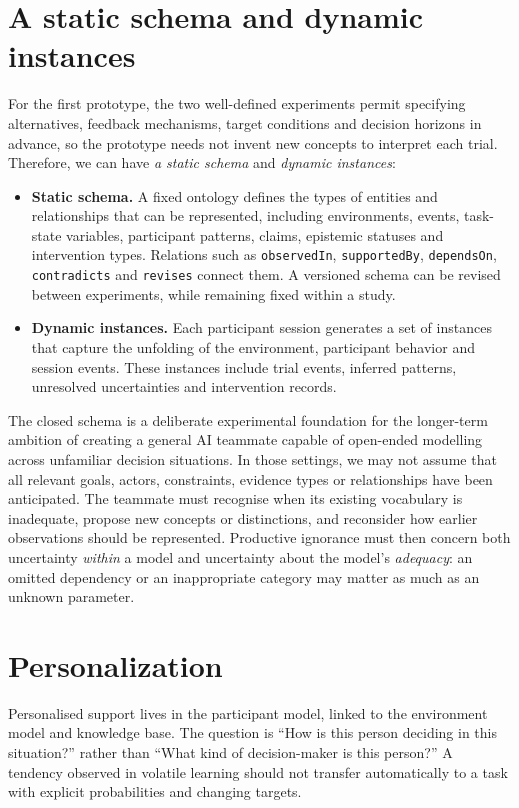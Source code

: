 \documentclass[11pt,a4paper]{article}
\begin{document}
\section{A static schema and dynamic instances}
For the first prototype, the two well-defined experiments permit specifying alternatives, feedback mechanisms, target conditions and decision horizons in advance, so the prototype needs not invent new concepts to interpret each trial. Therefore, we can have \emph{a static schema} and \emph{dynamic instances}:  
\begin{itemize}
  \item \textbf{Static schema.} A fixed ontology defines the types of entities and relationships that can be represented, including environments, events, task-state variables, participant patterns, claims, epistemic statuses and intervention types. Relations such as \texttt{observedIn}, \texttt{supportedBy}, \texttt{dependsOn}, \texttt{contradicts} and \texttt{revises} connect them. A versioned schema can be revised between experiments, while remaining fixed within a study.
  \item \textbf{Dynamic instances.} Each participant session generates a set of instances that capture the unfolding of the environment, participant behavior and session events. These instances include trial events, inferred patterns, unresolved uncertainties and intervention records.
\end{itemize}

The closed schema is a deliberate experimental foundation for the longer-term ambition of creating a general AI teammate capable of open-ended modelling across unfamiliar decision situations. In those settings, we may not assume that all relevant goals, actors, constraints, evidence types or relationships have been anticipated. The teammate must recognise when its existing vocabulary is inadequate, propose new concepts or distinctions, and reconsider how earlier observations should be represented. Productive ignorance must then concern both uncertainty \emph{within} a model and uncertainty about the model's \emph{adequacy}: an omitted dependency or an inappropriate category may matter as much as an unknown parameter.%

\section{Personalization}
Personalised support lives in the participant model, linked to the environment model and knowledge base. The question is ``How is this person deciding in this situation?'' rather than ``What kind of decision-maker is this person?'' A tendency observed in volatile learning should not transfer automatically to a task with explicit probabilities and changing targets. 
\end{document}
